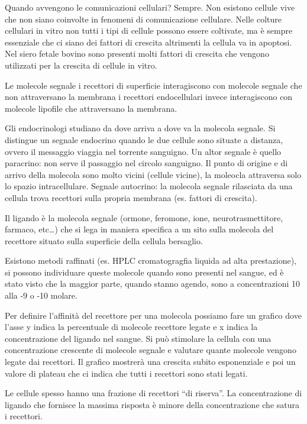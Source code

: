 \documentclass[]{article}
\begin{document}
Quando avvengono le comunicazioni cellulari? Sempre. Non esistono
cellule vive che non siano coinvolte in fenomeni di comunicazione
cellulare. Nelle colture cellulari in vitro non tutti i tipi di cellule
possono essere coltivate, ma è sempre essenziale che ci siano dei
fattori di crescita altrimenti la cellula va in apoptosi. Nel siero
fetale bovino sono presenti molti fattori di crescita che vengono
utilizzati per la crescita di cellule in vitro.

Le molecole segnale i recettori di superficie interagiscono con molecole
segnale che non attraversano la membrana i recettori endocellulari
invece interagiscono con molecole lipofile che attraversano la membrana.

Gli endocrinologi studiano da dove arriva a dove va la molecola segnale.
Si distingue un segnale endocrino quando le due cellule sono situate a
distanza, ovvero il messaggio viaggia nel torrente sanguigno. Un altor
segnale è quello paracrino: non serve il passaggio nel circolo
sanguigno. Il punto di origine e di arrivo della molecola sono molto
vicini (cellule vicine), la moleocla attraversa solo lo spazio
intracellulare. Segnale autocrino: la molecola segnale rilasciata da una
cellula trova recettori sulla propria membrana (es. fattori di
crescita).

Il ligando è la molecola segnale (ormone, feromone, ione,
neurotrasmettitore, farmaco, etc\ldots{}) che si lega in maniera
specifica a un sito sulla molecola del recettore situato sulla
superficie della cellula bersaglio.

Esistono metodi raffinati (es. HPLC cromatogragfia liquida ad alta
prestazione), si possono individuare queste molecole quando sono
presenti nel sangue, ed è stato visto che la maggior parte, quando
stanno agendo, sono a concentrazioni 10 alla -9 o -10 molare.

Per definire l'affinità del recettore per una molecola possiamo fare un
grafico dove l'asse y indica la percentuale di molecole recettore legate
e x indica la concentrazione del ligando nel sangue. Si può stimolare la
cellula con una concentrazione crescente di molecole segnale e valutare
quante molecole vengono legate dai recettori. Il grafico mostrerà una
crescita subito esponenziale e poi un valore di plateau che ci indica
che tutti i recettori sono stati legati.

Le cellule spesso hanno una frazione di recettori ``di riserva''. La
concentrazione di ligando che fornisce la massima risposta è minore
della concentrazione che satura i recettori.
\end{document}
